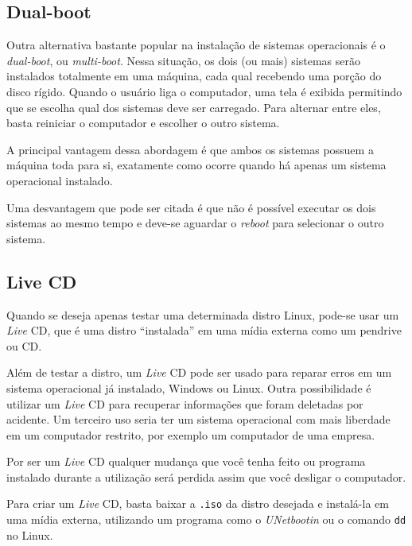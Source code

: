 \documentclass{handout_utfpr}
\begin{document}
\subsection{Dual-boot}
Outra alternativa bastante popular na instalação de sistemas operacionais é o \textit{dual-boot}, ou \textit{multi-boot}. Nessa situação, os dois (ou mais) sistemas serão instalados totalmente em uma máquina, cada qual recebendo uma porção do disco rígido. Quando o usuário liga o computador, uma tela é exibida permitindo que se escolha qual dos sistemas deve ser carregado. Para alternar entre eles, basta reiniciar o computador e escolher o outro sistema.

A principal vantagem dessa abordagem é que ambos os sistemas possuem a máquina toda para si, exatamente como ocorre quando há apenas um sistema operacional instalado.

Uma desvantagem que pode ser citada é que não é possível executar os dois sistemas ao mesmo tempo e deve-se aguardar o \textit{reboot} para selecionar o outro sistema.


\subsection{Live CD}

Quando se deseja apenas testar uma determinada distro Linux, pode-se usar um \textit{Live} CD, que é uma distro ``instalada'' em uma mídia externa como um pendrive ou CD. 

Além de testar a distro, um \textit{Live} CD pode ser usado para reparar erros em um sistema operacional já instalado, Windows ou Linux. Outra possibilidade é utilizar um \textit{Live} CD para recuperar informações que foram deletadas por acidente. Um terceiro uso seria ter um sistema operacional com mais liberdade em um computador restrito, por exemplo um computador de uma empresa.

Por ser um \textit{Live} CD qualquer mudança que você tenha feito ou programa instalado durante a utilização será perdida assim que você desligar o computador.

Para criar um \textit{Live} CD, basta baixar a \texttt{.iso} da distro desejada e instalá-la em uma mídia externa, utilizando um programa como o \emph{UNetbootin} ou o comando \texttt{dd} no Linux.
\end{document}

